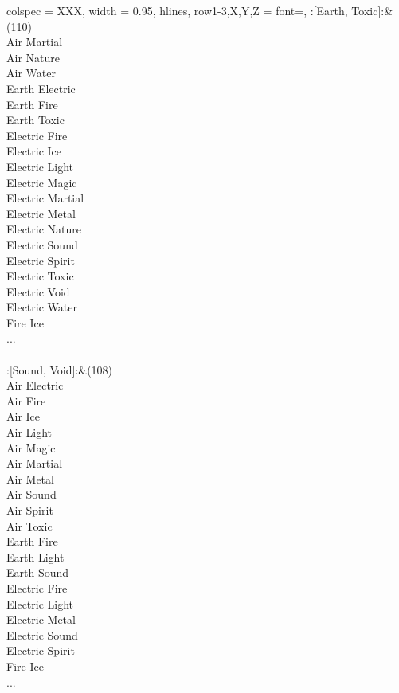 \begin{longtblr}[
	caption = {2v2 Defending Weak},
	label = {2v2-Defending-Weak},
]{
	colspec = {XXX}, width = 0.95\linewidth,
	hlines,
	row{1-3,X,Y,Z} = {font=\bfseries},
}
	:[Earth, Toxic]:&{(110)\\
	Air Martial \\
	Air Nature \\
	Air Water \\
	Earth Electric \\
	Earth Fire \\
	Earth Toxic \\
	Electric Fire \\
	Electric Ice \\
	Electric Light \\
	Electric Magic \\
	Electric Martial \\
	Electric Metal \\
	Electric Nature \\
	Electric Sound \\
	Electric Spirit \\
	Electric Toxic \\
	Electric Void \\
	Electric Water \\
	Fire Ice \\
	...\\
	}\\

	:[Sound, Void]:&{(108)\\
	Air Electric \\
	Air Fire \\
	Air Ice \\
	Air Light \\
	Air Magic \\
	Air Martial \\
	Air Metal \\
	Air Sound \\
	Air Spirit \\
	Air Toxic \\
	Earth Fire \\
	Earth Light \\
	Earth Sound \\
	Electric Fire \\
	Electric Light \\
	Electric Metal \\
	Electric Sound \\
	Electric Spirit \\
	Fire Ice \\
	...\\
	}\\


\end{longtblr}
